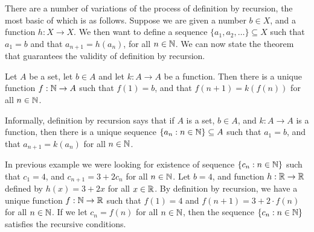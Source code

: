 \documentclass[a4paper,english,12pt]{article}
\begin{document}
There are a number of variations of the process of definition by recursion, the most basic of which is as follows. Suppose we are given a number $b \in X$, and a function $h:X \to X$. We then want to define a sequence $\{a_1,a_2, \ldots\} \subseteq X$ such that $a_1=b$ and that $a_{n+1}=h(a_n)$, for all  $n \in \mathbb{N}$. %
We can now state the theorem that guarantees the validity of definition by recursion.    
\begin{thm} Let $A$ be a set, let $b \in A$ and let $k : A \to A$ be a function. Then there is a unique function $f : \mathbb{N} \to A$ such that $f(1) = b$, and that $f(n + 1) = k(f(n))$ for all $n \in \mathbb{N}$.
\end{thm}
\begin{rem} Informally, definition by recursion says that if $A$ is a set, $b \in A$, and $k : 
A \to A$ is a function, then there is a unique sequence $\{a_n: n \in \mathbb{N}\} \subseteq A$ such that $a_1 = b$, and that $a_{n+1} = k(a_n)$ for all $n \in \mathbb{N}$. 
\end{rem}
\begin{exmp}\label{Exmp:Recurse} In previous example we were looking for existence of sequence $\{c_n: n \in \mathbb{N}\}$ such that $c_1 = 4$, and $c_{n+1} = 3 + 2c_n$ for all $n \in \mathbb{N}$. Let $b = 4$, and function $h : \mathbb{R} \to \mathbb{R}$ defined by $h(x) = 3+2x$ for all $x \in \mathbb{R}$. By definition by recursion, we have a unique function $f : \mathbb{N} \to \mathbb{R}$ such that $f(1) = 4$ and  $f(n + 1) = 3 + 2 \cdot f(n)$ for all $n \in \mathbb{N}$. If we let $c_n = f(n)$ for all $n \in \mathbb{N}$, then the sequence $\{c_n: n \in \mathbb{N}\}$ satisfies the recursive conditions. %
\end{exmp}
\end{document}
